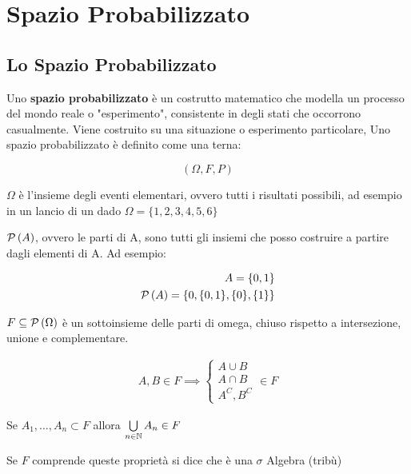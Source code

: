 \chapter{Spazio Probabilizzato}

\section{Lo Spazio Probabilizzato}

\begin{defn}
	Uno \textbf{spazio probabilizzato} è un costrutto matematico che modella un processo del mondo reale o "esperimento", consistente in degli stati che occorrono casualmente. Viene costruito su una situazione o esperimento particolare, Uno spazio probabilizzato è definito come una terna:
	
	\begin{equation}
		(\Omega, F, P)
	\end{equation}
	
	$ \Omega $ è l'insieme degli eventi elementari, ovvero tutti i risultati possibili, ad esempio in un lancio di un dado $ \Omega = \{1,2,3,4,5,6\} $
	
	$ \mathcal{P}\left(A\right)$, ovvero le parti di A, sono tutti gli insiemi che posso costruire a partire dagli elementi di A. Ad esempio:
	
	\begin{equation*}
		\begin{aligned}
			A = \{0, 1\} \\
			\mathcal{P}\left(A\right) = \{0, \{0, 1\}, \{0\}, \{1\}\}
		\end{aligned}
	\end{equation*}
	
	$ F \subseteq \mathcal{P}\left(\Omega\right) $ è un sottoinsieme delle parti di omega, chiuso rispetto a intersezione, unione e complementare.
	
	\begin{equation*}
	\begin{aligned}
		A,B \in F \implies \begin{cases}
			A \cup B \\
			A \cap B \\
			A^C, B^C
		\end{cases} \in F
	\end{aligned}
	\end{equation*}
	
	Se $ A_1, \dots, A_n \subset F $ allora $ \bigcup\limits_{n \in \mathbb{N}} A_n \in F $
	
	Se $ F $ comprende queste proprietà si dice che è una $ \sigma $ Algebra (tribù)
	

\end{defn}
